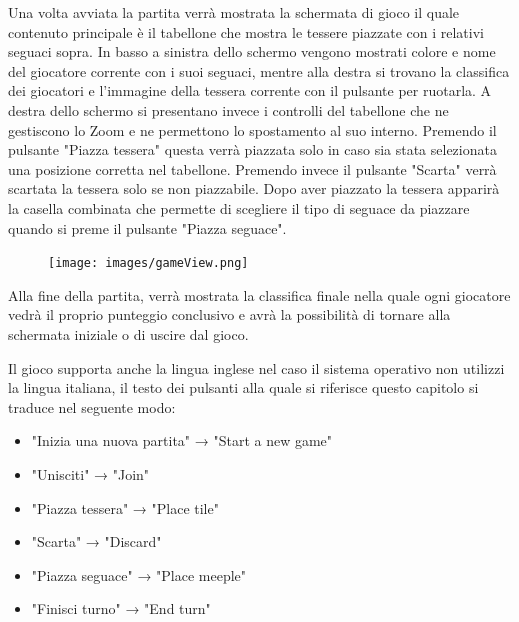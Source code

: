 Una volta avviata la partita verrà mostrata la schermata di gioco il quale contenuto principale è il tabellone che mostra le tessere piazzate con i relativi seguaci sopra. In basso a sinistra dello schermo vengono mostrati colore e nome del giocatore corrente con i suoi seguaci, mentre alla destra si trovano la classifica dei giocatori e l'immagine della tessera corrente con il pulsante per ruotarla. A destra dello schermo si presentano invece i controlli del tabellone che ne gestiscono lo Zoom e ne permettono lo spostamento al suo interno. Premendo il pulsante "Piazza tessera" questa verrà piazzata solo in caso sia stata selezionata una posizione corretta nel tabellone. Premendo invece il pulsante "Scarta" verrà scartata la tessera solo se non piazzabile. Dopo aver piazzato la tessera apparirà la casella combinata che permette di scegliere il tipo di seguace da piazzare quando si preme il pulsante "Piazza seguace".

\begin{figure}[ht]
    \centering\texttt{[image: images/gameView.png]}
\end{figure}

Alla fine della partita, verrà mostrata la classifica finale nella quale ogni giocatore vedrà il proprio punteggio conclusivo e avrà la possibilità di tornare alla schermata iniziale o di uscire dal gioco.
\medskip

Il gioco supporta anche la lingua inglese nel caso il sistema operativo non utilizzi la lingua italiana, il testo dei pulsanti alla quale si riferisce questo capitolo si traduce nel seguente modo:
\begin{itemize}
    \item "Inizia una nuova partita" → "Start a new game"
    \item "Unisciti" → "Join"
    \item "Piazza tessera" → "Place tile"
    \item "Scarta" → "Discard"
    \item "Piazza seguace" → "Place meeple"
    \item "Finisci turno" → "End turn"
\end{itemize}

